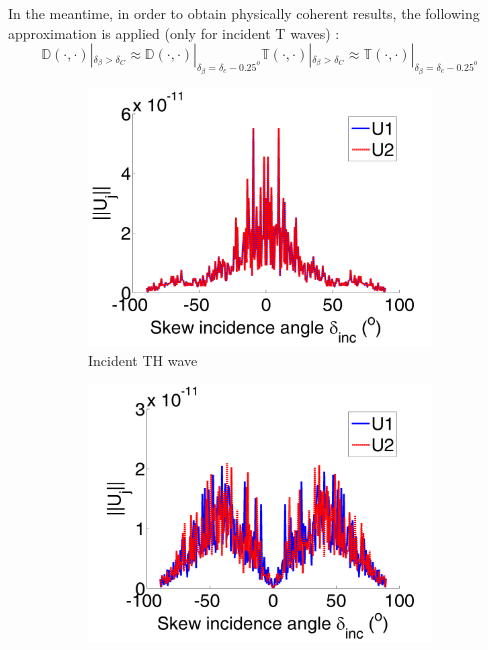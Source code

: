 In the meantime, in order to obtain physically coherent results, the following approximation is applied (only for incident T waves) :
\begin{subequations}
\begin{equation}
\mathbb{D}(\cdot,\cdot)|_{\delta_{\beta}>\delta_C} \approx \mathbb{D}(\cdot,\cdot)|_{\delta_{\beta}=\delta_c-0.25^o}
\end{equation}
\begin{equation}
\mathbb{T}(\cdot,\cdot)|_{\delta_{\beta}>\delta_C} \approx \mathbb{T}(\cdot,\cdot)|_{\delta_{\beta}=\delta_c-0.25^o}
\end{equation}
\label{const_reg_approx}
\end{subequations}

\begin{figure}
\centering
\begin{subfigure}[b]{0.45\textwidth}
        \includegraphics[width=\textwidth]{images/chapter4/const_reg/U1TH_180_50.png}
        \caption{Incident TH wave}
        \label{const_reg:U1TH}
    \end{subfigure}
   \begin{subfigure}[b]{0.45\textwidth}
        \includegraphics[width=\textwidth]{images/chapter4/const_reg/U1TV_180_50.png}

\end{subfigure}
\end{figure}
